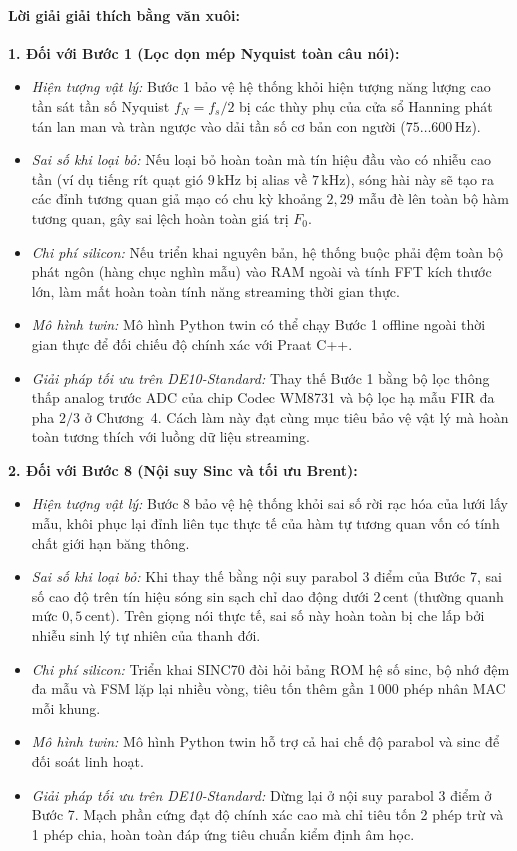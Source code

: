 \paragraph{Lời giải giải thích bằng văn xuôi:}
\textbf{1. Đối với Bước 1 (Lọc dọn mép Nyquist toàn câu nói):}
\begin{itemize}[leftmargin=1.2em]
    \item \emph{Hiện tượng vật lý:} Bước 1 bảo vệ hệ thống khỏi hiện tượng năng lượng cao tần sát tần số Nyquist $f_N = f_s/2$ bị các thùy phụ của cửa sổ Hanning phát tán lan man và tràn ngược vào dải tần số cơ bản con người ($75 \ldots 600\,\text{Hz}$).
    \item \emph{Sai số khi loại bỏ:} Nếu loại bỏ hoàn toàn mà tín hiệu đầu vào có nhiễu cao tần (ví dụ tiếng rít quạt gió $9\,\text{kHz}$ bị alias về $7\,\text{kHz}$), sóng hài này sẽ tạo ra các đỉnh tương quan giả mạo có chu kỳ khoảng $2{,}29$ mẫu đè lên toàn bộ hàm tương quan, gây sai lệch hoàn toàn giá trị $F_0$.
    \item \emph{Chi phí silicon:} Nếu triển khai nguyên bản, hệ thống buộc phải đệm toàn bộ phát ngôn (hàng chục nghìn mẫu) vào RAM ngoài và tính FFT kích thước lớn, làm mất hoàn toàn tính năng streaming thời gian thực.
    \item \emph{Mô hình twin:} Mô hình Python twin có thể chạy Bước 1 offline ngoài thời gian thực để đối chiếu độ chính xác với Praat C++.
    \item \emph{Giải pháp tối ưu trên DE10-Standard:} Thay thế Bước 1 bằng bộ lọc thông thấp analog trước ADC của chip Codec WM8731 và bộ lọc hạ mẫu FIR đa pha $2/3$ ở Chương~4. Cách làm này đạt cùng mục tiêu bảo vệ vật lý mà hoàn toàn tương thích với luồng dữ liệu streaming.
\end{itemize}

\textbf{2. Đối với Bước 8 (Nội suy Sinc và tối ưu Brent):}
\begin{itemize}[leftmargin=1.2em]
    \item \emph{Hiện tượng vật lý:} Bước 8 bảo vệ hệ thống khỏi sai số rời rạc hóa của lưới lấy mẫu, khôi phục lại đỉnh liên tục thực tế của hàm tự tương quan vốn có tính chất giới hạn băng thông.
    \item \emph{Sai số khi loại bỏ:} Khi thay thế bằng nội suy parabol 3 điểm của Bước 7, sai số cao độ trên tín hiệu sóng sin sạch chỉ dao động dưới $2\,\text{cent}$ (thường quanh mức $0{,}5\,\text{cent}$). Trên giọng nói thực tế, sai số này hoàn toàn bị che lấp bởi nhiễu sinh lý tự nhiên của thanh đới.
    \item \emph{Chi phí silicon:} Triển khai SINC70 đòi hỏi bảng ROM hệ số sinc, bộ nhớ đệm đa mẫu và FSM lặp lại nhiều vòng, tiêu tốn thêm gần $1\,000$ phép nhân MAC mỗi khung.
    \item \emph{Mô hình twin:} Mô hình Python twin hỗ trợ cả hai chế độ parabol và sinc để đối soát linh hoạt.
    \item \emph{Giải pháp tối ưu trên DE10-Standard:} Dừng lại ở nội suy parabol 3 điểm ở Bước 7. Mạch phần cứng đạt độ chính xác cao mà chỉ tiêu tốn 2 phép trừ và 1 phép chia, hoàn toàn đáp ứng tiêu chuẩn kiểm định âm học.
\end{itemize}

